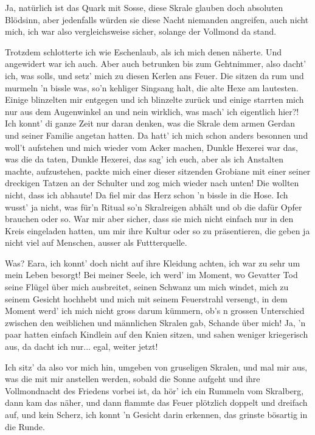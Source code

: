Ja, natürlich ist das Quark mit Sosse, diese Skrale glauben doch absoluten Blödsinn, aber jedenfalls würden sie diese Nacht niemanden angreifen, auch nicht mich, ich war also vergleichsweise sicher, solange der Vollmond da stand.

Trotzdem schlotterte ich wie Eschenlaub, als ich mich denen näherte. Und angewidert war ich auch. Aber auch betrunken bis zum Gehtnimmer, also dacht’ ich, was solls, und setz’ mich zu diesen Kerlen ans Feuer. Die sitzen da rum und murmeln ’n bissle was, so’n kehliger Singsang halt, die alte Hexe am lautesten. Einige blinzelten mir entgegen und ich blinzelte zurück und einige starrten mich nur aus dem Augenwinkel an und nein wirklich, was mach’ ich eigentlich hier?! Ich konnt’ di ganze Zeit nur daran denken, was die Skrale dem armen Gerdan und seiner Familie angetan hatten. Da hatt’ ich mich schon anders besonnen und woll’t aufstehen und mich wieder vom Acker machen, Dunkle Hexerei war das, was die da taten, Dunkle Hexerei, das sag’ ich euch, aber als ich Anstalten machte, aufzustehen, packte mich einer dieser sitzenden Grobiane mit einer seiner dreckigen Tatzen an der Schulter und zog mich wieder nach unten! Die wollten nicht, dass ich abhaute! Da fiel mir das Herz schon ’n bissle in die Hose. Ich wusst’ ja nicht, was für’n Ritual so’n Skralreigen abhält und ob die dafür Opfer brauchen oder so. War mir aber sicher, dass sie mich nicht einfach nur in den Kreis eingeladen hatten, um mir ihre Kultur oder so zu präsentieren, die geben ja nicht viel auf Menschen, ausser als Futtterquelle.

Was? Eara, ich konnt’ doch nicht auf ihre Kleidung achten, ich war zu sehr um mein Leben besorgt! Bei meiner Seele, ich werd’ im Moment, wo Gevatter Tod seine Flügel über mich ausbreitet, seinen Schwanz um mich windet, mich zu seinem Gesicht hochhebt und mich mit seinem Feuerstrahl versengt, in dem Moment werd’ ich mich nicht gross darum kümmern, ob’s n grossen Unterschied zwischen den weiblichen und männlichen Skralen gab, Schande über mich! Ja, ’n paar hatten einfach Kindlein auf den Knien sitzen, und sahen weniger kriegerisch aus, da dacht ich nur... egal, weiter jetzt!

Ich sitz’ da also vor mich hin, umgeben von gruseligen Skralen, und mal mir aus, was die mit mir anstellen werden, sobald die Sonne aufgeht und ihre Vollmondnacht des Friedens vorbei ist, da hör’ ich ein Rummeln vom Skralberg, dann kam das näher, und dann flammte das Feuer plötzlich doppelt und dreifach auf, und kein Scherz, ich konnt ’n Gesicht darin erkennen, das grinste bösartig in die Runde.

